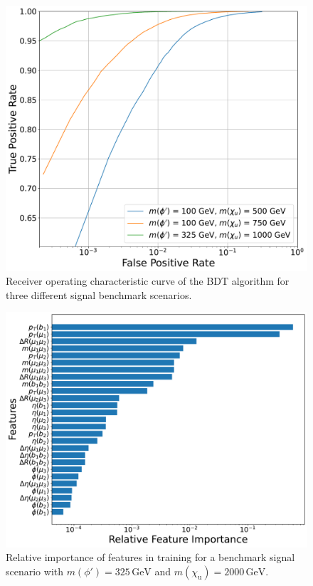 \begin{figure}
\centering
  \centering
  \includegraphics[width=.85\linewidth]{Images/ROC_Curve.pdf}
  \caption{Receiver operating characteristic curve of the BDT algorithm for three different signal benchmark scenarios.}
  \label{fig:ROC}
\end{figure}

\begin{figure}
\centering
  \centering
  \includegraphics[width=.85\linewidth]{Images/feature_importance.pdf}
  \caption{Relative importance of features in training for a benchmark signal scenario with $m(\phi')=325\, \mathrm{GeV}$ and $m(\chi_\mathrm{u})=2000\, \mathrm{GeV}$.}
  \label{fig:feature_importance}
\end{figure}


